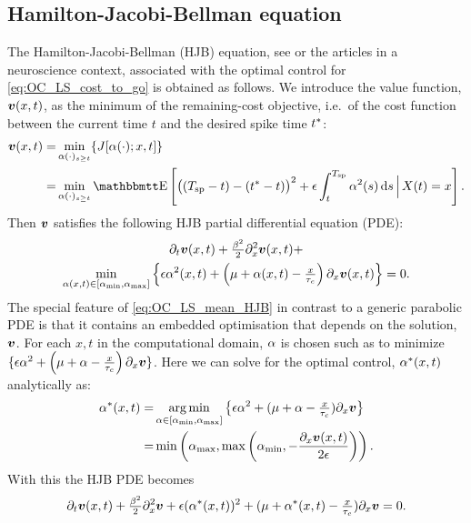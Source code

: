 \documentclass[12pt]{iopart}
\begin{document}
\subsection{Hamilton-Jacobi-Bellman equation}
The Hamilton-Jacobi-Bellman (HJB) equation, see \cite{Fleming1975,Whittle1996}
or the articles \cite{Danzl2009,Nabi2013a} in a neuroscience context, associated
with the optimal control for \cref{eq:OC_LS_cost_to_go} is obtained as follows.
We introduce the value function, ${ \boldsymbol{v} }(x,t)$, as the minimum of the remaining-cost objective, i.e.\ of
the cost function between the current time $t$ and the desired spike time
${ t^* }$:
\begin{align}
\v(x,t) =&
 \min_{\a(\cdot)_{s \geq t}}
 \{J[\a(\cdot); x,t] \}
\notag
\\
=&
\min_{\a(\cdot)_{s \geq t}}
\Exp\left[
\big((\ts-t) - (\T-t) \big)^2
+
\e \int_t^\ts  \a^2(s) \intd{s}
\,\Big|\,X(t) = x
\right].
\label{eq:OC_LS_mean_value}
\end{align}
Then ${ \boldsymbol{v} }$ satisfies the following HJB partial differential equation (PDE):
\begin{equation}
\begin{gathered}
{\partial}_t { \boldsymbol{v} }(x,t) + \tfrac{{\beta}^2}{2} {\partial}_x^2 { \boldsymbol{v} }(x,t) + \\
\min_{{\alpha}(x,t) \in [{ {\alpha}_{\textrm{min}} },
{ {\alpha}_{\textrm{max}} }]}\Big\{ {\epsilon} {\alpha}^2 (x,t)+ \left({\mu } + {\alpha}(x,t)-\tfrac{x}{{ \tau_{c} }}\right) {\partial}_x
{ \boldsymbol{v} }(x,t) \Big\} = 0.
\label{eq:OC_LS_mean_HJB}
\end{gathered}
\end{equation}
The special feature of \cref{eq:OC_LS_mean_HJB} in contrast to a generic
parabolic PDE is that it contains an embedded optimisation that depends on the
solution, ${ \boldsymbol{v} }$. For each $x,t$ in the computational domain,
${\alpha}$ is chosen such as to minimize $\{{\epsilon} {\alpha}^2 + \left({\mu } + {\alpha} -
\tfrac{x}{{ \tau_{c} }}\right) {\partial}_x { \boldsymbol{v} } \}$. Here we can solve for the optimal control, ${\alpha}^*(x,t)$ analytically as:
\begin{align}
\a^*(x,t)  =& \argmin_{\a \in [\amin, \amax]}\big\{\e \a^2 + (\m + \a-\tfrac{x}{\tc}) \di_x\v\big\}
\notag
\\
=&
\min \left(\amax, \max\left(\amin, -\frac{\di_x\v(x,t)}{2\e}\right)\right).
\label{eq:OC_LS_variance_energy_quadratic_control}
\end{align}
With this the HJB PDE becomes
\begin{equation}
{\partial}_t { \boldsymbol{v} }(x,t) + \tfrac{{\beta}^2}{2} {\partial}_x^2{ \boldsymbol{v} }+
{\epsilon} ({ {\alpha}^* }(x,t))^2 + ({\mu } + { {\alpha}^* }(x,t)-\tfrac{x}{{ \tau_{c} }}) {\partial}_x{ \boldsymbol{v} }
= 0.
\label{eq:OC_LS_mean_HJB_bounded_control}
\end{equation}
\end{document}
